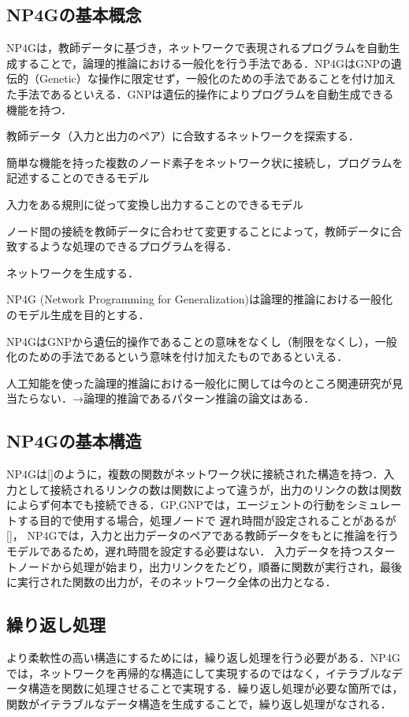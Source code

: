 \documentclass[exploratorypaper]{jsaiart} %
\begin{document}
\subsection{NP4Gの基本概念}
NP4Gは，教師データに基づき，ネットワークで表現されるプログラムを自動生成することで，論理的推論における一般化を行う手法である．NP4GはGNPの遺伝的（Genetic）な操作に限定せず，一般化のための手法であることを付け加えた手法であるといえる．GNPは遺伝的操作によりプログラムを自動生成できる機能を持つ．

教師データ（入力と出力のペア）に合致するネットワークを探索する．

簡単な機能を持った複数のノード素子をネットワーク状に接続し，プログラムを記述することのできるモデル

入力をある規則に従って変換し出力することのできるモデル

ノード間の接続を教師データに合わせて変更することによって，教師データに合致するような処理のできるプログラムを得る．

ネットワークを生成する．

NP4G (Network Programming for Generalization)は論理的推論における一般化のモデル生成を目的とする．

NP4GはGNPから遺伝的操作であることの意味をなくし（制限をなくし），一般化のための手法であるという意味を付け加えたものであるといえる．

人工知能を使った論理的推論における一般化に関しては今のところ関連研究が見当たらない．→論理的推論であるパターン推論の論文はある．
\subsection{NP4Gの基本構造}
NP4Gは[]のように，複数の関数がネットワーク状に接続された構造を持つ．入力として接続されるリンクの数は関数によって違うが，出力のリンクの数は関数によらず何本でも接続できる．GP,GNPでは，エージェントの行動をシミュレートする目的で使用する場合，処理ノードで
遅れ時間が設定されることがあるが[]，
NP4Gでは，入力と出力データのペアである教師データをもとに推論を行うモデルであるため，遅れ時間を設定する必要はない．
入力データを持つスタートノードから処理が始まり，出力リンクをたどり，順番に関数が実行され，最後に実行された関数の出力が，そのネットワーク全体の出力となる．

\subsection{繰り返し処理}
より柔軟性の高い構造にするためには，繰り返し処理を行う必要がある．NP4Gでは，ネットワークを再帰的な構造にして実現するのではなく，イテラブルなデータ構造を関数に処理させることで実現する．繰り返し処理が必要な箇所では，関数がイテラブルなデータ構造を生成することで，繰り返し処理がなされる．
\end{document}
